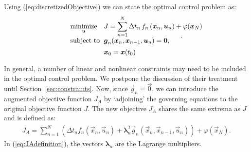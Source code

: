\documentclass[twocolumn,numbook]{svjour3}          %
\makeatletter
\newcommand{\fsum}[3]{\sum_{#1}^{#2}{#3}}
\def\u{{\vec u}}
\def\x{{\vec x}}
\def\p{{\vec{g}}}
\def\0{{\vec 0}}
\def\blambda{{\pmb{\lambda}}}%
\def\M{{\varphi}}
\def\F{f}
\def\myobj{J}
\def\minim{\mathop{\hbox{\rm minimize}}}
\def\minimize#1{{\displaystyle\minim_{#1}}}
\def\subject{\mbox{\rm subject to}}
\def\newproblem#1#2#3#4#5{%
   {\begin{tabular*}{0.47\textwidth}
    {@{}l@{\extracolsep{\fill}}l@{\extracolsep{6pt}}l@{\extracolsep{\fill}}c@{}}
      #1 & $\minimize{#2}$ & $#3$ & $ $ \\[5pt]
         & $\subject$      & $#4$ & $ $ \\[5pt]
         & & $#5$ & $ $
    \end{tabular*}}}
\makeatother
\begin{document}
Using (\ref{eq:discretizedObjective}) we can state the optimal control
problem as:
\[
   \newproblem{}{\u}{\displaystyle \myobj =
  \sum_{n=1}^N \Delta t_n \, \F_n \left ( \x_n, \u_n \right ) + \M(\x_N) }
                 {\p_n(\x_n, \x_{n-1}, \u_n) = \0,}
                 {\x_0 = \x(t_0)}.
\]

In general, a number of linear and nonlinear constraints may need to be included in the optimal
control problem. We postpone the discussion of their treatment until Section~\ref{sec:constraints}. 
Now, since $\p_n = \0$, we can introduce the augmented objective function $\myobj_A$ by `adjoining' 
the governing equations to the original objective function $\myobj$. The new objective $\myobj_A$ shares
the same extrema as $\myobj$ and is defined as:
%
\begin{align}
\label{eq:JAdefinition}
  \myobj_A = \fsum{n=1}{N}{\left ( \Delta t_n \F_n(\x_n, \u_n)
      + \blambda^T_n \p_n (\x_n, \x_{n-1}, \u_n)  \right )}
   + \M(\x_N).
\end{align}
%
In (\ref{eq:JAdefinition}), the vectors $\blambda_n$ are the Lagrange multipliers.
\end{document}
